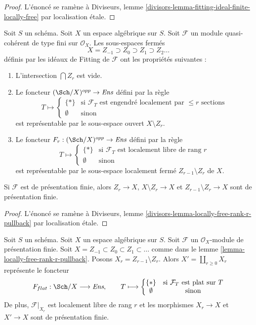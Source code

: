 \begin{proof}
L'énoncé se ramène à
Diviseurs, lemme \ref{divisors-lemma-fitting-ideal-finite-locally-free}
par localisation \'etale.
\end{proof}

\begin{lemma}
\label{lemma-locally-free-rank-r-pullback}
Soit $S$ un schéma. Soit $X$ un espace algébrique sur $S$.
Soit $\mathcal{F}$ un module quasi-cohérent de type fini
sur $\mathcal{O}_X$. Les sous-espaces fermés
$$
X = Z_{-1} \supset Z_0 \supset Z_1 \supset Z_2 \ldots
$$
définis par les idéaux de Fitting de $\mathcal{F}$ ont les propriétés
suivantes :
\begin{enumerate}
\item L'intersection $\bigcap Z_r$ est vide.
\item Le foncteur $(\Sch/X)^{opp} \to \textit{Ens}$ défini par la règle
$$
T \longmapsto
\left\{
\begin{matrix}
\{*\} & \text{si }\mathcal{F}_T\text{ est engendré localement par }
\leq r\text{ sections} \\
\emptyset & \text{sinon}
\end{matrix}
\right.
$$
est représentable par le sous-espace ouvert $X \setminus Z_r$.
\item Le foncteur $F_r : (\Sch/X)^{opp} \to \textit{Ens}$ défini par la règle
$$
T \longmapsto
\left\{
\begin{matrix}
\{*\} & \text{si }\mathcal{F}_T\text{ est localement libre de rang }r\\
\emptyset & \text{sinon}
\end{matrix}
\right.
$$
est représentable par le sous-espace localement fermé $Z_{r - 1} \setminus Z_r$
de $X$.
\end{enumerate}
Si $\mathcal{F}$ est de présentation finie, alors
$Z_r \to X$, $X \setminus Z_r \to X$ et $Z_{r - 1} \setminus Z_r \to X$
sont de présentation finie.
\end{lemma}

\begin{proof}
L'énoncé se ramène à
Diviseurs, lemme \ref{divisors-lemma-locally-free-rank-r-pullback}
par localisation \'etale.
\end{proof}

\begin{lemma}
\label{lemma-finite-presentation-module}
Soit $S$ un schéma. Soit $X$ un espace algébrique sur $S$.
Soit $\mathcal{F}$ un $\mathcal{O}_X$-module
de présentation finie. Soit $X = Z_{-1} \subset Z_0 \subset Z_1 \subset \ldots$
comme dans le lemme \ref{lemma-locally-free-rank-r-pullback}.
Posons $X_r = Z_{r - 1} \setminus Z_r$.
Alors $X' = \coprod_{r \geq 0} X_r$ représente le foncteur
$$
F_{flat} : \Sch/X \longrightarrow \textit{Ens},\quad\quad
T \longmapsto
\left\{
\begin{matrix}
\{*\} & \text{si }\mathcal{F}_T\text{ est plat sur }T\\
\emptyset & \text{sinon}
\end{matrix}
\right.
$$
De plus, $\mathcal{F}|_{X_r}$ est localement libre de rang $r$ et les
morphismes $X_r \to X$ et $X' \to X$ sont de présentation finie.
\end{lemma}

